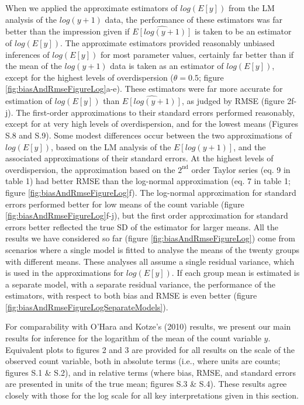\documentclass[]{article}
\begin{document}
When we applied the approximate estimators of \(log(E[y])\) from the LM
analysis of the \(log(y+1)\) data, the performance of these estimators
was far better than the impression given if \(\widehat{E[log(y+1)]}\) is
taken to be an estimator of \(log(E[y])\). The approximate estimators
provided reasonably unbiased inferences of \(log(E[y])\) for most
parameter values, certainly far better than if the mean of the
\(log(y+1)\) data is taken as an estimator of \(log(E[y])\), except for
the highest levels of overdispersion (\(\theta=0.5\); figure
\ref{fig:biasAndRmseFigureLog}a-e). These estimators were far more
accurate for estimation of \(log(E[y])\) than \(\widehat{E[log(y+1)]}\),
as judged by RMSE (figure 2f-j). The first-order approximations to their
standard errors performed reasonably, except for at very high levels of
overdispersion, and for the lowest means (Figures S.8 and S.9). Some
modest differences occur between the two approximations of
\(log(E[y])\), based on the LM analysis of the \(E[log(y+1)]\), and the
associated approximations of their standard errors. At the highest
levels of overdispersion, the approximation based on the
\(2^{\text{nd}}\) order Taylor series (eq. 9 in table 1) had better RMSE
than the log-normal approximation (eq. 7 in table 1; figure
\ref{fig:biasAndRmseFigureLog}f). The log-normal approximation for
standard errors performed better for low means of the count variable
(figure \ref{fig:biasAndRmseFigureLog}f-j), but the first order
approximation for standard errors better reflected the true SD of the
estimator for larger means. All the results we have considered so far
(figure \ref{fig:biasAndRmseFigureLog}) come from scenarios where a
single model is fitted to analyse the means of the twenty groups with
different means. These analyses all assume a single residual variance,
which is used in the approximations for \(log(E[y])\). If each group
mean is estimated is a separate model, with a separate residual
variance, the performance of the estimators, with respect to both bias
and RMSE is even better (figure
\ref{fig:biasAndRmseFigureLogSeparateModels}).

For comparability with O'Hara and Kotze's (2010) results, we present our
main results for inference for the logarithm of the mean of the count
variable \(y\). Equivalent plots to figures 2 and 3 are provided for all
results on the scale of the observed count variable, both in absolute
terms (i.e., where units are counts; figures S.1 \& S.2), and in
relative terms (where bias, RMSE, and standard errors are presented in
units of the true mean; figures S.3 \& S.4). These results agree closely
with those for the log scale for all key interpretations given in this
section.
\end{document}
